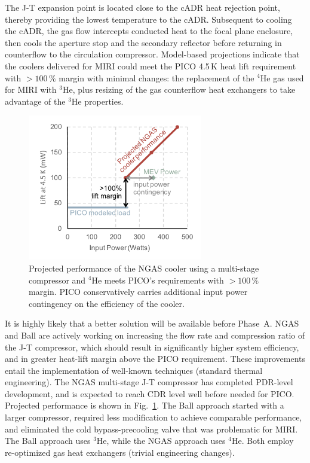 The J-T expansion point is located close to the cADR heat rejection
point, thereby providing the lowest temperature to the
cADR. Subsequent to cooling the cADR, the gas flow intercepts
conducted heat to the focal plane enclosure, then cools the aperture
stop and the secondary reflector before returning in counterflow to
the circulation compressor.  Model-based projections indicate that the
coolers delivered for MIRI could meet the PICO 4.5\,K heat lift
requirement with $>100\,\%$ margin with minimal changes: the replacement
of the $^4$He gas used for MIRI with $^3$He, plus resizing of the gas
counterflow heat exchangers to take advantage of the $^3$He properties.

\begin{figure}
\parbox{3.5in}{\centering 
\includegraphics[width=3in]{figures/CoolerFigure.png} }
\parbox{3.0in}{
\caption{\captiontext 
  Projected performance of the NGAS cooler using a multi-stage
  compressor and $^4$He \citep{Rabb2013} meets PICO's requirements
  with $>100\,\%$ margin. PICO conservatively carries additional input
  power contingency on the efficiency of the
  cooler.\label{fig:CoolerFigure}} }
\end{figure}

It is highly likely that a better solution will be available before
Phase~A. NGAS and Ball are actively working on increasing the flow
rate and compression ratio of the J-T compressor, which should result
in significantly higher system efficiency, and in greater heat-lift
margin above the PICO requirement. These improvements entail the
implementation of well-known techniques (standard thermal
engineering). The NGAS multi-stage J-T compressor has completed
PDR-level development, and is expected to reach CDR level well before
needed for PICO. Projected performance is shown in Fig.~\ref{fig:CoolerFigure}. The
Ball approach started with a larger compressor, required less
modification to achieve comparable performance, and eliminated the
cold bypass-precooling valve that was problematic for MIRI. The Ball
approach uses $^3$He, while the NGAS approach uses $^4$He. Both employ
re-optimized gas heat exchangers (trivial engineering changes).


